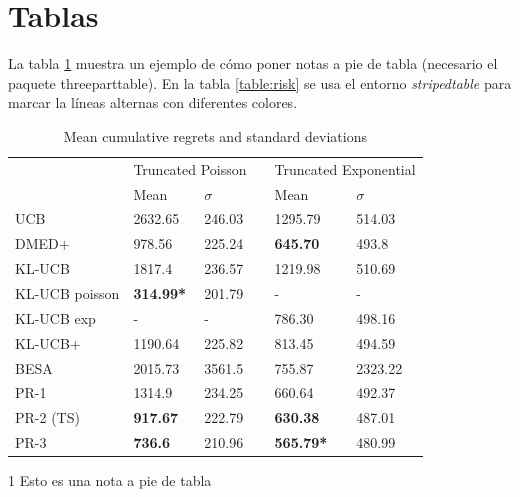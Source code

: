 \section{Tablas}
La tabla \ref{table:results45} muestra un ejemplo de cómo poner notas a pie de tabla (necesario el paquete threeparttable). En la tabla \ref{table:risk} se usa el entorno \textit{stripedtable} para marcar la líneas alternas con diferentes colores.

\begin{table}[htb]
\begin{threeparttable}
	\centering
	\caption{Mean cumulative regrets and standard deviations}
	\label{table:results45}
	\begin{small}
	\begin{tabular}{llllll}
		\toprule
			& \multicolumn{2}{c}{Truncated Poisson} & & \multicolumn{2}{c}{Truncated Exponential} \\ 
		\cmidrule{2-3}\cmidrule{5-6}
		 	& Mean & $\sigma$ & & Mean & $\sigma$\\ \midrule
		 UCB\tnote{1} & 2632.65 & 246.03 & & 1295.79 & 514.03 \\
		 DMED+ & 978.56 & 225.24 & & \textbf{645.70} & 493.8 \\
		 KL-UCB & 1817.4 & 236.57 & & 1219.98 & 510.69 \\
		 KL-UCB poisson & \textbf{314.99*} & 201.79 & & - & - \\
		 KL-UCB exp & - & - & & 786.30 & 498.16 \\
		 KL-UCB+ & 1190.64 & 225.82 & & 813.45 & 494.59 \\
		 BESA & 2015.73 & 3561.5 & & 755.87 & 2323.22 \\
		 PR-1 & 1314.9 & 234.25 & & 660.64 & 492.37 \\ 
		 PR-2 (TS) & \textbf{917.67} & 222.79 & & \textbf{630.38} & 487.01 \\
		 PR-3 & \textbf{736.6} & 210.96 & & \textbf{565.79*} & 480.99 \\
		 \bottomrule
	\end{tabular}
	\end{small}
	\begin{tablenotes}
		\item[1] Esto es una nota a pie de tabla
	\end{tablenotes}
\end{threeparttable}
\end{table}

